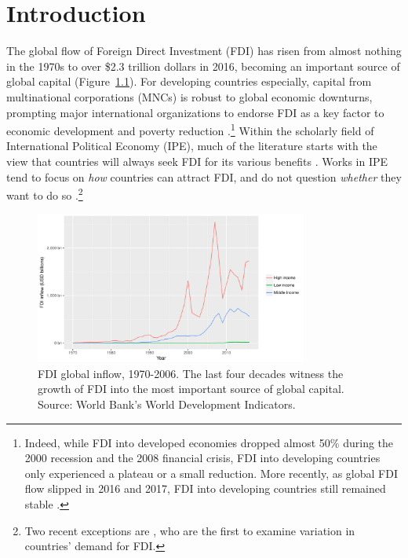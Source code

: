 \chapter{Introduction}
\label{chap:introduction}

The global flow of Foreign Direct Investment (FDI) has risen from almost nothing
in the 1970s to over \$2.3 trillion dollars in 2016, becoming an important
source of global capital (Figure~\ref{fig:globalfdi}). For developing countries
especially, capital from multinational corporations (MNCs) is robust to global
economic downturns, prompting major international organizations to endorse FDI
as a key factor to economic development and poverty reduction
\citep{Mallampally1999, WorldEconomicForum2013}.\footnote{Indeed, while FDI into
  developed economies dropped almost 50\% during the 2000 recession and the 2008
  financial crisis, FDI into developing countries only experienced a plateau or
  a small reduction. More recently, as global FDI flow slipped in 2016 and 2017,
  FDI into developing countries still remained stable \citep{UNCTAD2018}.} Within the scholarly
field of International Political Economy (IPE), much of the literature starts
with the view that countries will always seek FDI for its various benefits
\citep{Jensen2008b}. Works in IPE tend to focus on \textit{how} countries can
attract FDI, and do not question \textit{whether} they want to do so
\citep{Jensen2003, Li2003, Li2006, Ahlquist2006}.\footnote{Two recent exceptions
  are \citet{Pinto2013, Pandya2016}, who are the first to examine variation in
  countries' demand for FDI.}

\begin{figure}[tbp]
  \centering
  \includegraphics[width=0.8\textwidth,keepaspectratio]{../figure/global_fdi}
  \caption[FDI global inflow, 1970-2006.]{FDI global inflow, 1970-2006. The last
    four decades witness the growth of FDI into the most important source of
    global capital. Source: World Bank's World Development Indicators.}
  \label{fig:globalfdi}
\end{figure}

